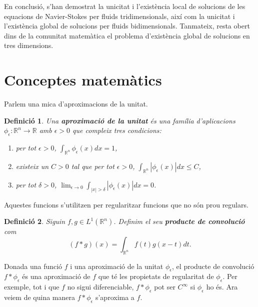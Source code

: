 \documentclass{article}
\numberwithin{equation}{section}
\newtheorem{definicio}{Definici\'{o}}[section]
\begin{document}
En conclusi\'{o}, s'han demostrat la unicitat i l'exist\`{e}ncia local de solucions de les equacions de Navier-Stokes per fluids tridimensionals, aix\'{i} com la unicitat i l'exist\`{e}ncia global de solucions per fluids bidimensionals. Tanmateix, resta obert dins de la comunitat matem\`{a}tica el problema d'exist\`{e}ncia global de solucions en tres dimensions.

\nocite{*}




\newpage

\appendix

\section{Conceptes matem\`{a}tics}\label{App: apendix}

Parlem una mica d'aproximacions de la unitat.

\begin{definicio}
Una \textbf{aproximaci\'{o} de la unitat} \'{e}s una fam\'{i}lia d'aplicacions $\phi_{\epsilon}:\mathbb{R}^n\rightarrow\mathbb{R}$ amb $\epsilon>0$ que compleix tres condicions:
\begin{enumerate}
\item per tot $\epsilon>0$, $\displaystyle{\int_{\mathbb{R}^n}\phi_{\epsilon}(x)dx=1}$,
\item existeix un $C>0$ tal que per tot $\epsilon>0$, $\displaystyle{\int_{\mathbb{R}^n}|\phi_{\epsilon}(x)|dx\leq C}$,
\item per tot $\delta>0$, $\displaystyle{\lim_{\epsilon\to0}\int_{|x|>\delta}|\phi_{\epsilon}(x)|dx=0}$.
\end{enumerate}
\end{definicio}

Aquestes funcions s'utilitzen per regularitzar funcions que no s\'{o}n prou regulars.

\begin{definicio}
Siguin $f,g\in L^1(\mathbb{R}^n)$. Definim el seu \textbf{producte de convoluci\'{o}} com
\[(f*g)(x)=\int_{\mathbb{R}^n}f(t)g(x-t)dt.\]
\end{definicio}

Donada una funci\'{o} $f$ i una aproximaci\'{o} de la unitat $\phi_{\epsilon}$, el producte de convoluci\'{o} $f*\phi_{\epsilon}$ \'{e}s una aproximaci\'{o} de $f$ que t\'{e} les propietats de regularitat de $\phi_{\epsilon}$. Per exemple, tot i que $f$ no sigui diferenciable, $f*\phi_{\epsilon}$ pot ser $C^{\infty}$ si $\phi_{\epsilon}$ ho \'{e}s. Ara veiem de quina manera $f*\phi_{\epsilon}$ s'aproxima a $f$.
\end{document}
